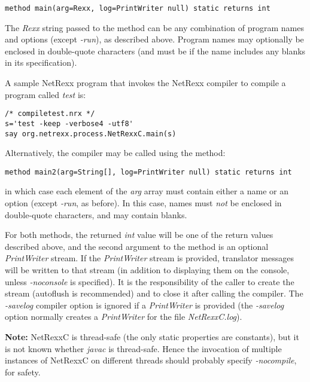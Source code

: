 {\begin{lstlisting}[label=ivmain,caption=Invoking NetRexxC.main]
method main(arg=Rexx, log=PrintWriter null) static returns int
\end{lstlisting}

The \emph{Rexx} string passed to the method can be any combination of
program names and options (except \emph{-run}), as described above.
Program names may optionally be enclosed in double-quote characters (and
must be if the name includes any blanks in its specification).

A sample NetRexx program that invokes the NetRexx compiler to compile a
program called \emph{test} is:
\begin{lstlisting}[label=compiletest,caption=Compiletest]
/* compiletest.nrx */
s='test -keep -verbose4 -utf8'
say org.netrexx.process.NetRexxC.main(s)
\end{lstlisting}

Alternatively, the compiler may be called using the method:
\begin{lstlisting}[label=array,caption=Calling with Array argument]
method main2(arg=String[], log=PrintWriter null) static returns int
\end{lstlisting}
in which case each element of the \emph{arg} array must contain
either a name or an option (except \emph{-run}, as before).  In this
case, names must \emph{not} be enclosed in double-quote characters, and
may contain blanks.

For both methods, the returned \emph{int} value will be one of the
return values described above, and the second argument to the method is
an optional \emph{PrintWriter} stream.  If the \emph{PrintWriter} stream
is provided, translator messages will be written to that stream (in
addition to displaying them on the console, unless \emph{-noconsole} is
specified).
It is the responsibility of the caller to create the stream (autoflush
is recommended) and to close it after calling the compiler.
The \emph{-savelog} compiler option is ignored if a \emph{PrintWriter}
is provided (the \emph{-savelog} option normally creates
a \emph{PrintWriter} for the file \emph{NetRexxC.log}).

\textbf{Note:} NetRexxC is thread-safe (the only static properties are constants), but
it is not known whether \emph{javac} is thread-safe.  Hence the
invocation of multiple instances of NetRexxC on different threads should
probably specify \emph{-nocompile}, for safety.

}
